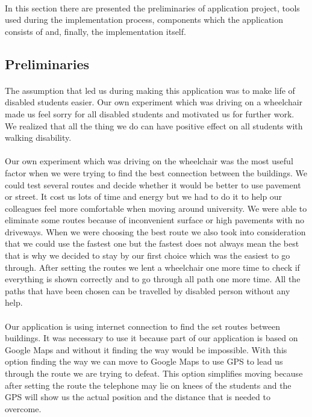 \documentclass[12pt]{article}
\begin{document}
\paragraph{} In this section there are presented the preliminaries of application project, tools used during the implementation process, components which the application consists of and, finally, the implementation itself.
\subsection{Preliminaries}
\paragraph{}
The assumption that led us during making this application was to make life of disabled students easier. Our own experiment which was driving on a wheelchair made us feel sorry for all disabled students and motivated us for further work.  We realized that all the thing we do can have positive effect on all students with walking disability.
\paragraph{}
Our own experiment which was driving on the wheelchair was the most useful factor when we were trying to find the best connection between the buildings. We could test several routes and decide whether it would be better to use pavement or street. It cost us lots of time and energy but we had to do it to help our colleagues feel more comfortable when moving around university.  We were able to eliminate some routes because of inconvenient surface or high pavements with no driveways. When we were choosing the best route we also took into consideration that we could use the fastest one but the fastest does not always mean the best that is why we decided to stay by our first choice which was the easiest to go through. After setting the routes we lent a wheelchair one more time to check if everything is shown correctly and to go through all path one more time. All the paths that  have been chosen can be travelled by disabled person without any help.
\paragraph{}
Our application is using internet connection to find the set routes between buildings. It was necessary to use it because part of our application is based on Google Maps and without it finding the way would be impossible. With this option finding the way we can move to Google Maps to use GPS to lead us through the route we are trying to defeat. This option simplifies moving because after setting the route the telephone may lie on knees of the students and the GPS will show us the actual position and the distance that is needed to overcome.
\end{document}
